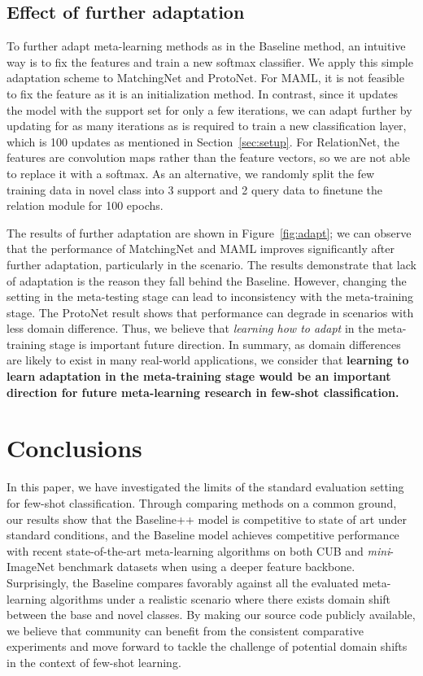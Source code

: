 \documentclass{article}
\newlength\secmargin
\newcommand{\secref}[1]{Section~\ref{sec:#1}}
\newcommand{\figref}[1]{Figure~\ref{fig:#1}}
\newcommand{\tb}[1]{\textbf{#1}}
\def \miniI {\emph{mini}-ImageNet }
\begin{document}
\vspace{\secmargin}
\subsection{Effect of further adaptation}
\label{ssec:adapt}
To further adapt meta-learning methods as in the Baseline method, an intuitive way is to fix the features and train a new softmax classifier. We apply this simple adaptation scheme to MatchingNet and ProtoNet. For MAML, it is not feasible to fix the feature as it is an initialization method. In contrast, since it updates the model with the support set for only a few iterations, we can adapt further by updating for as many iterations as is required to train a new classification layer, which is 100 updates as mentioned in \secref{setup}. For RelationNet, the features are convolution maps rather than the feature vectors, so we are not able to replace it with a softmax. As an alternative, we randomly split the few training data in novel class into 3 support and 2 query data to finetune the relation module for 100 epochs.


The results of further adaptation are shown in \figref{adapt}; we can observe that the performance of MatchingNet and MAML improves significantly after further adaptation, particularly in the \miniICUB scenario. The results demonstrate that lack of adaptation is the reason they fall behind the Baseline. However, changing the setting in the meta-testing stage can lead to inconsistency with the meta-training stage. The ProtoNet result shows that performance can degrade in scenarios with less domain difference. Thus, we believe that \emph{learning how to adapt} in the meta-training stage is important future direction.
In summary, as domain differences are likely to exist in many real-world applications, we consider that \tb{learning to learn adaptation in the meta-training stage would be an important direction for future meta-learning research in few-shot classification.} \vspace{\secmargin}
\section{Conclusions}
\label{sec:conclusions}  
In this paper, we have investigated the limits of the standard evaluation setting for few-shot classification. Through comparing methods on a common ground, our results show that the Baseline++ model is competitive to state of art under standard conditions, and the Baseline model achieves competitive performance with recent state-of-the-art meta-learning algorithms on both CUB and \miniI benchmark datasets when using a deeper feature backbone. 
Surprisingly, the Baseline compares favorably against all the evaluated meta-learning algorithms under a realistic scenario where there exists domain shift between the base and novel classes. 
By making our source code publicly available, we believe that community can benefit from the consistent comparative experiments and move forward to tackle the challenge of potential domain shifts in the context of few-shot learning. 
\end{document}
